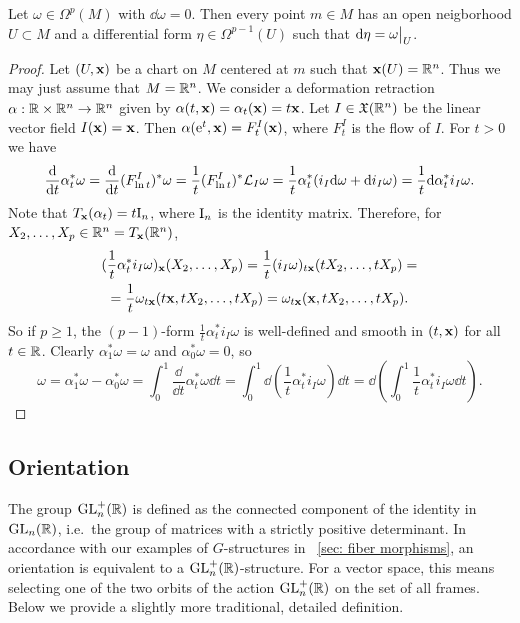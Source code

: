 \begin{thm}
    Let $\omega\in\Omega^p(M)$ with $\dd\omega=0$. Then every point $m\in M$ has an open neigborhood $U\subset M$ and a differential form $\eta\in\Omega^{p-1}(U)$ such that $\dd\eta=\restr{\omega}{U}$.
\end{thm}
\begin{proof}
    Let $(U,\bf{x})$ be a chart on $M$ centered at $m$ such that $\bf{x}(U)=\bbR^n$. Thus we may just assume that $M=\bbR^n$. We consider a deformation retraction $\alpha:\bbR\times\bbR^n\to \bbR^n$ given by $\alpha(t,\bf{x})=\alpha_t(\bf{x})=t\bf{x}$. Let $I\in \fX(\bbR^n)$ be the linear vector field $I(\bf{x})=\bf{x}$. Then $\alpha(\rme^t,\bf{x})=F^I_t(\bf{x})$, where $F^I_t$ is the flow of $I$. For $t>0$ we have 
    \[\frac{\dd}{\dd t}\alpha_t^\ast\omega=\frac{\dd}{\dd t}(F^I_{\ln t})^\ast\omega=\frac{1}{t}(F^I_{\ln t})^\ast \Lie_{I}\omega=\frac{1}{t}\alpha_t^\ast(i_{I}\dd\omega+\dd i_{I}\omega)=\frac{1}{t}\dd\alpha_t^\ast i_{I}\omega.\]
    Note that $T_{\bf{x}}(\alpha_t)=t\rmI_n$, where $\rmI_n$ is the identity matrix. Therefore, for $X_2,\ldots,X_p\in \bbR^n=T_{\bf{x}}(\bbR^n)$,
    \begin{multline}
        (\frac{1}{t}\alpha_t^\ast i_{I}\omega)_{\bf{x}}(X_2,\ldots,X_p)=\frac{1}{t}(i_I\omega)_{t\bf{x}}(tX_2,\ldots,tX_p)=\\
        =\frac{1}{t}\omega_{t\bf{x}}(t\bf{x},tX_2,\ldots,tX_p)=\omega_{t\bf{x}}(\bf{x},tX_2,\ldots,tX_p).
    \end{multline}
    So if $p\geq 1$, the $(p-1)$-form $\frac{1}{t}\alpha^\ast_t i_I\omega$ is well-defined and smooth in $(t,\bf{x})$ for all $t\in\bbR$. Clearly $\alpha^\ast_1\omega=\omega$ and $\alpha^\ast_0\omega=0$, so 
    \[\omega=\alpha_1^\ast\omega-\alpha^\ast_0\omega=\int_0^1\frac{\dd}{\dd t}\alpha_t^\ast\omega\dd t=\int_0^1\dd \left(\frac{1}{t}\alpha_t^\ast i_I\omega\right)\dd t=\dd \left(\int_0^1\frac{1}{t}\alpha_t^\ast i_I\omega\dd t\right).\]
\end{proof}




\subsection{Orientation}

The group $\GL^+_n(\bbR )$ is defined as the connected component of the identity in $\GL_n(\bbR )$, i.e.\ the group of matrices with a strictly positive determinant. In accordance with our examples of $G$-structures in \sect~\ref{sec: fiber morphisms}, an orientation is equivalent to a $\GL_n^+(\bbR)$-structure. For a vector space, this means selecting one of the two orbits of the action $\GL_n^+(\bbR)$ on the set of all frames. Below we provide a slightly more traditional, detailed definition.

